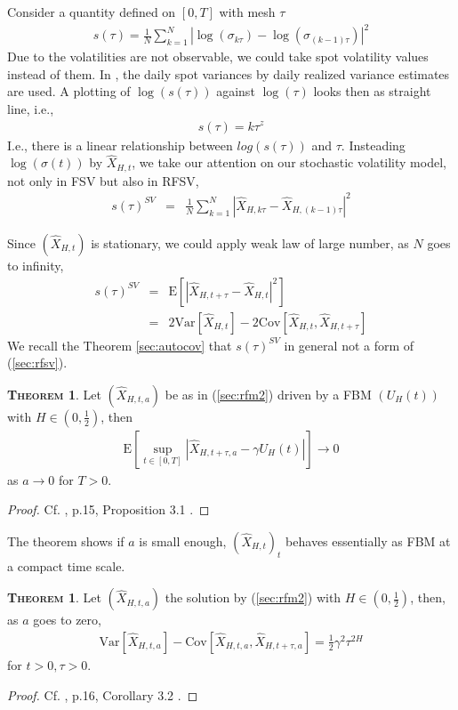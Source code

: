 \documentclass[a4paper, twoside, 11pt]{article}
\theoremstyle{definition}
\newtheorem{theorem}[definition]{\scshape Theorem}
\begin{document}
Consider a quantity defined on $[0, T]$ with mesh $\tau$
\begin{eqnarray}
  s(\tau) = \frac{1}{N}\sum\limits_{k=1}^N|\log(\sigma_{k\tau}) - \log(\sigma_{(k-1)\tau})|^2
  \label{sec:smo}
\end{eqnarray}
Due to the volatilities are not observable, we could take spot volatility values instead of them. In \cite{chridito}, the daily spot variances by daily realized variance estimates are used. A plotting of $\log(s(\tau))$ against $\log(\tau)$ looks then as straight line, i.e.,
\begin{eqnarray}
  s(\tau) =  k\tau^z
  \label{sec:smth}
\end{eqnarray}
I.e., there is a linear relationship between $log(s(\tau))$ and $\tau$. Insteading $\log(\sigma(t))$ by $\hat{X}_{H,t}$,  we take our attention on our stochastic volatility model, not only in FSV but also in RFSV, 
\begin{eqnarray}
  s(\tau)^{SV} &=&  \frac {1}{N}\sum\limits_{k=1}^N|\hat{X}_{H,k\tau} - \hat{X}_{H,(k-1)\tau}|^2\nonumber
\end{eqnarray}

Since $(\hat{X}_{H,t})$ is stationary, we could apply weak law of large number, as $N$ goes to infinity,
\begin{eqnarray}
  s(\tau)^{SV} &=& \mathrm{E}[|\hat{X}_{H,t+\tau}-\hat{X}_{H,t}|^2]\nonumber\\
  &=& 2 \mathrm{Var}[\hat{X}_{H,t}] - 2 \mathrm{Cov}[\hat{X}_{H,t}, \hat{X}_{H,t+\tau}]\nonumber
  \label{sec:smtsv}
\end{eqnarray}
We recall the Theorem \ref{sec:autocov} that $s(\tau)^{SV}$ in general not a form of (\ref{sec:rfsv}).

\begin{theorem}
  Let $(\hat{X}_{H, t, a})$ be as in (\ref{sec:rfm2}) driven by a FBM $(U_H(t))$ with $H\in (0,\frac{1}{2})$, then
  \begin{eqnarray*}
	\mathrm{E}[\sup\limits_{t\in [0, T]}|\hat{X}_{H,t+\tau, a} - \gamma U_H(t)|]\rightarrow 0
  \end{eqnarray*}
 as $a\rightarrow 0$ for $T > 0$.
\end{theorem}
\begin{proof}
  Cf. \cite{gradin}, p.15, Proposition 3.1 .
\end{proof}

The theorem shows if $a$ is small enough, $(\hat{X}_{H, t})_t$ behaves essentially as FBM at a compact time scale.

\begin{theorem}
  Let $(\hat{X}_{H, t, a})$ the solution by (\ref{sec:rfm2}) with $H\in(0, \frac{1}{2})$, then, as $a$ goes to zero,
  \begin{eqnarray}
	\mathrm{Var}[\hat{X}_{H,t, a}] - \mathrm{Cov}[\hat{X}_{H,t, a}, \hat{X}_{H,t+\tau, a}] = \frac{1}{2} \gamma^2\tau^{2H}
	\label{sec:rfsv}
  \end{eqnarray}
  for $t>0, \tau>0$.
\end{theorem}
\begin{proof}
  Cf. \cite{gradin}, p.16, Corollary 3.2 .
\end{proof}
\end{document}
